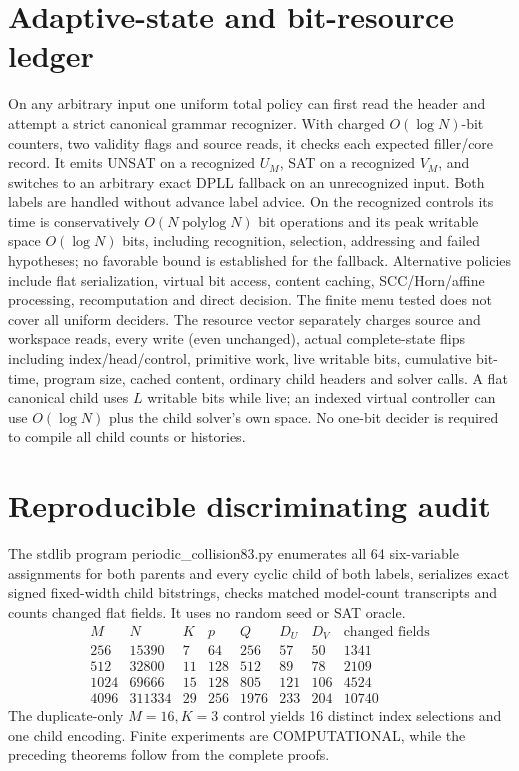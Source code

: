 \documentclass[11pt]{article}
\begin{document}
\section{Adaptive-state and bit-resource ledger}
On any arbitrary input one uniform total policy can first read the header and attempt a strict canonical grammar recognizer. With charged \(O(\log N)\)-bit counters, two validity flags and source reads, it checks each expected filler/core record. It emits UNSAT on a recognized \(U_M\), SAT on a recognized \(V_M\), and switches to an arbitrary exact DPLL fallback on an unrecognized input. Both labels are handled without advance label advice. On the recognized controls its time is conservatively \(O(N\operatorname{polylog}N)\) bit operations and its peak writable space \(O(\log N)\) bits, including recognition, selection, addressing and failed hypotheses; no favorable bound is established for the fallback.
Alternative policies include flat serialization, virtual bit access, content caching, SCC/Horn/affine processing, recomputation and direct decision. The finite menu tested does not cover all uniform deciders. The resource vector separately charges source and workspace reads, every write (even unchanged), actual complete-state flips including index/head/control, primitive work, live writable bits, cumulative bit-time, program size, cached content, ordinary child headers and solver calls. A flat canonical child uses \(L\) writable bits while live; an indexed virtual controller can use \(O(\log N)\) plus the child solver's own space. No one-bit decider is required to compile all child counts or histories.

\section{Reproducible discriminating audit}
The stdlib program periodic_collision83.py enumerates all 64 six-variable assignments for both parents and every cyclic child of both labels, serializes exact signed fixed-width child bitstrings, checks matched model-count transcripts and counts changed flat fields. It uses no random seed or SAT oracle.
\[
\begin{array}{rrrrrrrr}
 M&N&K&p&Q&D_U&D_V&\text{changed fields}\\\hline
256&15390&7&64&256&57&50&1341\\
512&32800&11&128&512&89&78&2109\\
1024&69666&15&128&805&121&106&4524\\
4096&311334&29&256&1976&233&204&10740
\end{array}
\]
The duplicate-only \(M=16,K=3\) control yields 16 distinct index selections and one child encoding. Finite experiments are COMPUTATIONAL, while the preceding theorems follow from the complete proofs.
\end{document}
